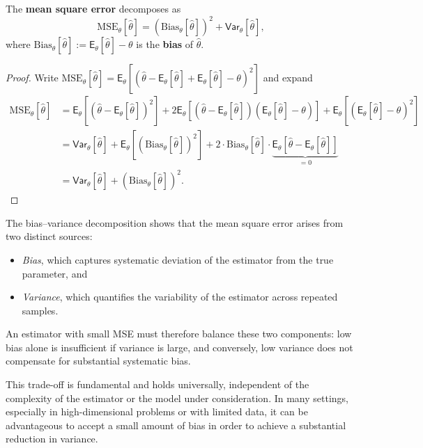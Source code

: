 \begin{theo}[]
\label{theo:mse}
    The \textbf{mean square error} decomposes as 
    \[
        \text{MSE}_{\theta}[\hat{\theta}] = (\text{Bias}_{\theta}[\hat{\theta}])^2 + \mathsf{Var}_{\theta}[\hat{\theta}],
    \]
    where \(\text{Bias}_{\theta}[\hat{\theta}] := \mathsf{E}_{\theta}[\hat{\theta}] - \theta\) is the \textbf{bias} of \(\hat{\theta}\). 
\end{theo}
\begin{proof}
    Write \(\text{MSE}_{\theta}[\hat{\theta}] = \mathsf{E}_{\theta}\left[ (\hat{\theta}-\mathsf{E}_{\theta}[\hat{\theta}]+\mathsf{E}_{\theta}[\hat{\theta}]-\theta)^2 \right]\)
    and expand
    \begin{align*}
        \text{MSE}_{\theta}[\hat{\theta}]
        &= \mathsf{E}_{\theta}\left[ (\hat{\theta}-\mathsf{E}_{\theta}[\hat{\theta}])^2 \right]
           + 2\mathsf{E}_{\theta}\left[ (\hat{\theta}-\mathsf{E}_{\theta}[\hat{\theta}])(\mathsf{E}_{\theta}[\hat{\theta}]-\theta) \right]
           + \mathsf{E}_{\theta}\left[(\mathsf{E}_{\theta}[\hat{\theta}]-\theta)^2 \right]   \\
        &= \mathsf{Var}_{\theta}[\hat{\theta}] + \mathsf{E}_{\theta}\left[  (\text{Bias}_{\theta}[\hat{\theta}])^2 \right] + 2 \cdot \text{Bias}_{\theta}[\hat{\theta}] \cdot \underbrace{\mathsf{E}_{\theta}\left[ \hat{\theta}-\mathsf{E}_{\theta}[\hat{\theta}] \right]}_{=0} \\
        &= \mathsf{Var}_{\theta}[\hat{\theta}] + (\text{Bias}_{\theta}[\hat{\theta}])^2.
    \end{align*}
\end{proof}

\noindent
{}
The bias--variance decomposition shows that the mean square error arises from two distinct sources:
\begin{itemize}
    \item \emph{Bias}, which captures systematic deviation of the estimator from the true parameter, and
    \item \emph{Variance}, which quantifies the variability of the estimator across repeated samples.
\end{itemize}
An estimator with small MSE must therefore balance these two components: low bias alone is insufficient if variance is large, and conversely, low variance does not compensate for substantial systematic bias.

This trade-off is fundamental and holds universally, independent of the complexity of the estimator or the model under consideration.
In many settings, especially in high-dimensional problems or with limited data, it can be advantageous to accept a small amount of bias in order to achieve a substantial reduction in variance.

